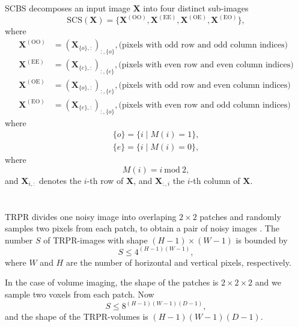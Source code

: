 \begin{subappendices}
\acrshort{SCBS} \cite{koho2019fourier} decomposes an input image $\mathbf{X}$
into four distinct sub-images
\begin{equation}
  \mathrm{SCS}(\mathbf{X}) = \{\mathbf{X}^{(\text{OO})}, \mathbf{X}^{(\text{EE})}, \mathbf{X}^{(\text{OE})}, \mathbf{X}^{(\text{EO})} \},
\end{equation}
where
\begin{align}
  \mathbf{X}^{(\text{OO})} & = (\mathbf{X}_{\{o\},:})_{:,\{o\}}, \text{(pixels with odd row and odd column indices)} \\
  \mathbf{X}^{(\text{EE})} & = (\mathbf{X}_{\{e\},:})_{:,\{e\}}, \text{(pixels with even row and even column indices)}\\
  \mathbf{X}^{(\text{OE})} & = (\mathbf{X}_{\{o\},:})_{:,\{e\}}, \text{(pixels with odd row and even column indices)}\\
  \mathbf{X}^{(\text{EO})} & = (\mathbf{X}_{\{e\},:})_{:,\{o\}}, \text{(pixels with even row and odd column indices)}
\end{align}
where
\begin{align}
  \{o\} = \{i\mid M(i)=1\}, \\
  \{e\} = \{i\mid M(i)=0\},
\end{align}
where
\begin{equation}
  M(i) = i~\text{mod}~2,
\end{equation}
and $\mathbf{X}_{i,:}$ denotes the $i$-th row of $\mathbf{X}$, and
$\mathbf{X}_{:,i}$ the $i$-th column of $\mathbf{X}$.


\section{}
\label{sec:TRPR}

\acrshort{TRPR} divides one noisy image into overlaping $2\times 2$ patches
and randomly samples two pixels from each patch, to obtain a pair of
noisy images \cite{ma2025spatiotemporal}. The number $S$ of
\gls{TRPR}-images with shape $(H-1)\times (W-1)$ is bounded by
\begin{equation}
  S \leq 4^{(H-1)(W-1)},
\end{equation}
where $W$ and $H$ are the number of horizontal and vertical pixels,
respectively.

In the case of volume imaging, the shape of the patches is
$2\times 2\times 2$ and we sample two voxels from each patch. Now
\begin{equation}
  S \leq 8^{(H-1)(W-1)(D-1)},
\end{equation}
and the shape of the \gls{TRPR}-volumes is $(H-1)(W-1)(D-1)$.


\end{subappendices}
